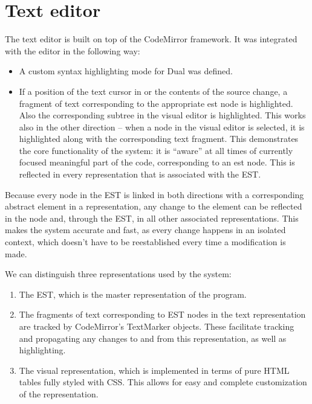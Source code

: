 \section{Text editor}
The text editor is built on top of the CodeMirror
framework\cite{codemirror_site}. It was integrated with the
editor in the following way:
\begin{itemize}
    \item A custom syntax highlighting mode for Dual was defined.  %
    \item If a position of the text cursor in or the contents of the source
      change, a fragment of text corresponding to the appropriate \acrshort{est}
      node is highlighted. Also the corresponding subtree in the visual editor
      is highlighted. This works also in the other direction -- when a node in
      the visual editor is selected, it is highlighted along with the
      corresponding text fragment. This demonstrates the core functionality of
      the system: it is ``aware'' at all times of currently focused meaningful
      part of the code, corresponding to an \acrshort{est} node. This is
      reflected in every representation that is associated with the EST.
\end{itemize}
Because every node in the EST is linked in both directions with a corresponding
abstract element in a representation, any change to the element can be reflected
in the node and, through the EST, in all other associated representations. This
makes the system accurate and fast, as every change happens in an isolated
context, which doesn't have to be reestablished every time a modification is
made.

We can distinguish three representations used by the system:
\begin{enumerate}
    \item The EST, which is the master representation of the program.
    \item The fragments of text corresponding to EST nodes in the text
      representation are tracked by CodeMirror's TextMarker objects. These
      facilitate tracking and propagating any changes to and from this
      representation, as well as highlighting.
    \item The visual representation, which is implemented in terms of pure HTML
      tables fully styled with CSS. This allows for easy and complete
      customization of the representation.
\end{enumerate}



